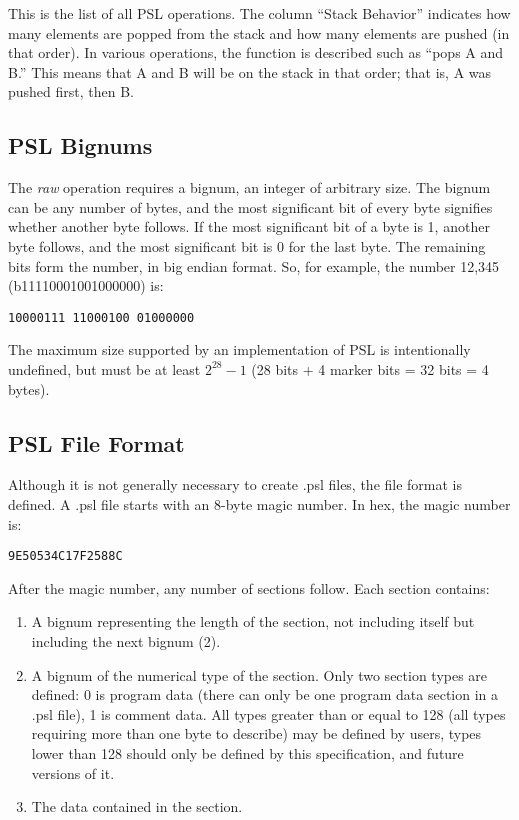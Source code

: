 This is the list of all PSL operations. The column “Stack Behavior” indicates how many elements are popped from the stack and how many elements are pushed (in that order). In various operations, the function is described such as “pops A and B.” This means that A and B will be on the stack in that order; that is, A was pushed first, then B.



\noindent
{}
%
%

\subsection{PSL Bignums}

The \textit{raw} operation requires a bignum, an integer of arbitrary size. The bignum can be any number of bytes, and the most significant bit of every byte signifies whether another byte follows. If the most significant bit of a byte is 1, another byte follows, and the most significant bit is 0 for the last byte. The remaining bits form the number, in big endian format. So, for example, the number 12,345 (b11110001001000000) is:

\noindent\texttt{10000111 11000100 01000000}

The maximum size supported by an implementation of PSL is intentionally undefined, but must be at least $2^{28}-1$ (28 bits + 4 marker bits = 32 bits = 4 bytes).



\subsection{PSL File Format}

Although it is not generally necessary to create .psl files, the file format is defined. A .psl file starts with an 8-byte magic number. In hex, the magic number is:

\noindent\texttt{9E50534C17F2588C}

After the magic number, any number of sections follow. Each section contains:

\begin{enumerate}
\item A bignum representing the length of the section, not including itself but including the next bignum (2).
\item A bignum of the numerical type of the section. Only two section types are defined: 0 is program data (there can only be one program data section in a .psl file), 1 is comment data. All types greater than or equal to 128 (all types requiring more than one byte to describe) may be defined by users, types lower than 128 should only be defined by this specification, and future versions of it.
\item The data contained in the section.
\end{enumerate}
